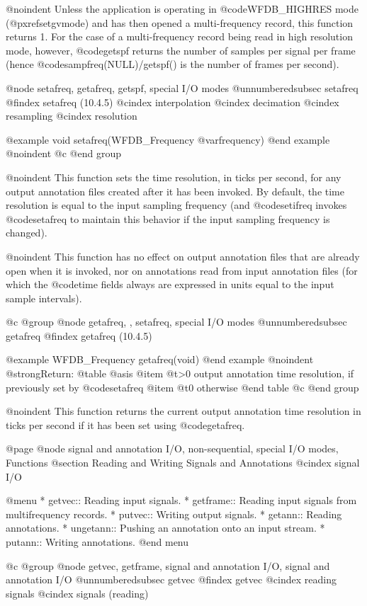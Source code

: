 {{{{{{{{@noindent
Unless the application is operating in @code{WFDB_HIGHRES} mode
(@pxref{setgvmode}) and has then opened a multi-frequency record, this
function returns 1.  For the case of a multi-frequency record being read
in high resolution mode, however, @code{getspf} returns the number of
samples per signal per frame (hence @code{sampfreq(NULL)/getspf()} is
the number of frames per second).

@node     setafreq, getafreq, getspf, special I/O modes
@unnumberedsubsec setafreq
@findex setafreq (10.4.5)
@cindex interpolation
@cindex decimation
@cindex resampling
@cindex resolution

@example
void setafreq(WFDB_Frequency @var{frequency})
@end example
@noindent
@c @end group

@noindent
This function sets the time resolution, in ticks per second, for any output
annotation files created after it has been invoked.  By default, the time
resolution is equal to the input sampling frequency (and @code{setifreq}
invokes @code{setafreq} to maintain this behavior if the input sampling
frequency is changed).

@noindent
This function has no effect on output annotation files that are already open
when it is invoked, nor on annotations read from input annotation files
(for which the @code{time} fields always are expressed in units equal to
the input sample intervals).

@c @group
@node     getafreq, , setafreq, special I/O modes
@unnumberedsubsec getafreq
@findex getafreq (10.4.5)

@example
WFDB_Frequency getafreq(void)
@end example
@noindent
@strong{Return:}
@table @asis
@item @t{>0}
output annotation time resolution, if previously set by @code{setafreq}
@item @t{0}
otherwise
@end table
@c @end group

@noindent
This function returns the current output annotation time resolution
in ticks per second if it has been set using @code{getafreq}.

@page
@node     signal and annotation I/O, non-sequential, special I/O modes, Functions
@section Reading and Writing Signals and Annotations
@cindex signal I/O

@menu
* getvec::		Reading input signals.
* getframe::            Reading input signals from multifrequency records.
* putvec::		Writing output signals.
* getann::		Reading annotations.
* ungetann::		Pushing an annotation onto an input stream.
* putann::		Writing annotations.
@end menu

@c @group
@node    getvec, getframe, signal and annotation I/O, signal and annotation I/O
@unnumberedsubsec getvec
@findex getvec
@cindex reading signals
@cindex signals (reading)

}}}}}}}}
